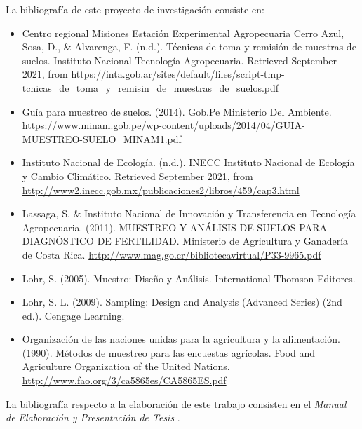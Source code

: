 \documentclass{report}
\begin{document}
La bibliografía de este proyecto de investigación consiste en:

\begin{itemize}
    \item Centro regional Misiones Estación Experimental Agropecuaria Cerro Azul, Sosa, D., \& Alvarenga, F. (n.d.). Técnicas de toma y remisión de muestras de suelos. Instituto Nacional Tecnología Agropecuaria. Retrieved September 2021, from \url{https://inta.gob.ar/sites/default/files/script-tmp-tcnicas_de_toma_y_remisin_de_muestras_de_suelos.pdf}
    
    \item Guía para muestreo de suelos. (2014). Gob.Pe Ministerio Del Ambiente. \url{https://www.minam.gob.pe/wp-content/uploads/2014/04/GUIA-MUESTREO-SUELO_MINAM1.pdf}
    
    \item Instituto Nacional de Ecología. (n.d.). INECC Instituto Nacional de Ecología y Cambio Climático. Retrieved September 2021, from \url{http://www2.inecc.gob.mx/publicaciones2/libros/459/cap3.html}
    
    \item Lassaga, S. \& Instituto Nacional de Innovación y Transferencia en Tecnología Agropecuaria. (2011). MUESTREO Y ANÁLISIS DE SUELOS PARA DIAGNÓSTICO DE FERTILIDAD. Ministerio de Agricultura y Ganadería de Costa Rica. \url{http://www.mag.go.cr/bibliotecavirtual/P33-9965.pdf}
    
    \item Lohr, S. (2005). Muestro: Diseño y Análisis. International Thomson Editores.
    
    \item Lohr, S. L. (2009). Sampling: Design and Analysis (Advanced Series) (2nd ed.). Cengage Learning.
    
    \item Organización de las naciones unidas para la agricultura y la alimentación. (1990). Métodos de muestreo para las encuestas agrícolas. Food and Agriculture Organization of the United Nations. \url{http://www.fao.org/3/ca5865es/CA5865ES.pdf}
\end{itemize}

La bibliografía respecto a la elaboración de este trabajo consisten en el \textit{Manual de Elaboración y Presentación de Tesis} \cite{universidad-san-carlos-2016}.

\printbibliography
\end{document}
